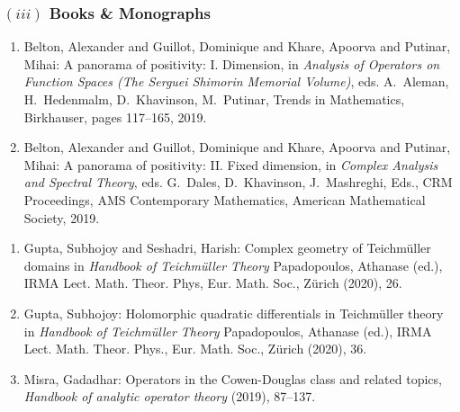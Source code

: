 \subsubsection*{{\small $(iii)$ {\sc Books \& Monographs}}}\vspace{-1mm}


\renewcommand{\theenumi}{B.\arabic{enumi}}
\begin{enumerate}%

	\item Belton, Alexander and Guillot, Dominique and Khare, Apoorva and Putinar, Mihai: A panorama of positivity: I.
	      Dimension, in {\em Analysis of Operators on Function Spaces (The Serguei Shimorin Memorial Volume)}, eds.
	      A.~Aleman, H.~Hedenmalm, D.~Khavinson, M.~Putinar, Trends in Mathematics,  Birkhauser, pages 117--165, 2019.

	\item Belton, Alexander and Guillot, Dominique and Khare, Apoorva and Putinar, Mihai: A panorama of positivity: II.
	      Fixed dimension, in {\em Complex Analysis and Spectral Theory}, eds.  G.~Dales, D.~Khavinson, J.~Mashreghi, Eds.,
	      CRM Proceedings, AMS  Contemporary Mathematics, American Mathematical Society, 2019.

\end{enumerate}


\begin{enumerate}[resume]%

	\item Gupta, Subhojoy and Seshadri, Harish: Complex geometry of Teichm{\"u}ller domains in {\em Handbook
			      of Teichm{\"u}ller Theory} Papadopoulos, Athanase (ed.), IRMA Lect. Math. Theor. Phys, Eur. Math. Soc., Z{\"u}rich
	      (2020), 26.

	\item Gupta, Subhojoy: Holomorphic quadratic differentials in Teichm{\"u}ller theory in {\em Handbook
			      of Teichm{\"u}ller Theory} Papadopoulos, Athanase (ed.), IRMA Lect. Math. Theor. Phys., Eur. Math. Soc., Z{\"u}rich
	      (2020), 36.


	\item Misra, Gadadhar: Operators in the {C}owen-{D}ouglas class and related topics, \emph{Handbook of analytic operator theory} {\bf } (2019), 87--137.
\end{enumerate}
